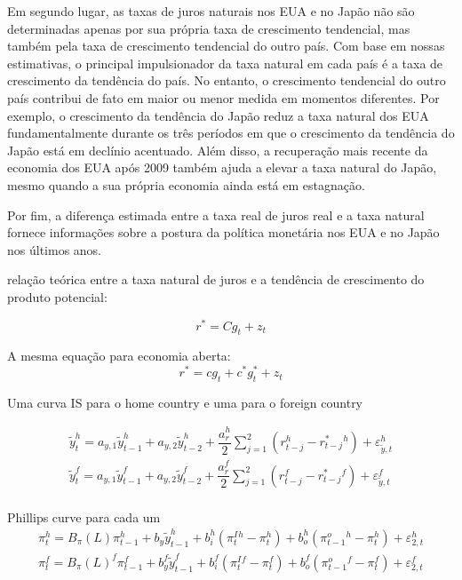 Em segundo lugar, as taxas de juros naturais nos EUA e no Japão não são determinadas apenas por sua própria taxa de crescimento tendencial, mas também pela taxa de crescimento tendencial do outro país. Com base em nossas estimativas, o principal impulsionador da taxa natural em cada país é a taxa de crescimento da tendência do país. No entanto, o crescimento tendencial do outro país contribui de fato em maior ou menor medida em momentos diferentes. Por exemplo, o crescimento da tendência do Japão reduz a taxa natural dos EUA fundamentalmente durante os três períodos em que o crescimento da tendência do Japão está em declínio acentuado. Além disso, a recuperação mais recente da economia dos EUA após 2009 também ajuda a elevar a taxa natural do Japão, mesmo quando a sua própria economia ainda está em estagnação.

Por fim, a diferença estimada entre a taxa real de juros real e a taxa natural fornece informações sobre a postura da política monetária nos EUA e no Japão nos últimos anos.

\citet{LW:2003} relação teórica entre a taxa natural de juros e a tendência de crescimento do produto potencial:

\begin{equation}
    r^{*} = C g_t + z_t
\end{equation}

A mesma equação para economia aberta:
\begin{equation}
    r^{*} = c g_t + c^{*} g_t^{*} + z_t
\end{equation}

Uma curva IS para o home country e uma para o foreign country

\begin{eqnarray}
    \tilde{y}_t^{h} = a_{y,1}\tilde{y}_{t-1}^{h} + a_{y,2}\tilde{y}_{t-2}^{h} + \dfrac{a_r^{h}}{2} \sum_{j=1}^{2} (r_{t-j}^{h} - r_{t-j}^{*}^{h}) + \varepsilon_{\tilde{y},t}^{h} \\
    \tilde{y}_t^{f} = a_{y,1}\tilde{y}_{t-1}^{f} + a_{y,2}\tilde{y}_{t-2}^{f} + \dfrac{a_r^{f}}{2} \sum_{j=1}^{2} (r_{t-j}^{f} - r_{t-j}^{*}^{f}) + \varepsilon_{\tilde{y},t}^{f} \\
    
\end{eqnarray}

Phillips curve para cada um
\begin{eqnarray}
    \pi_t^{h} = B_{\pi}(L)\pi_{t-1}^{h} + b_y \tilde{y}_{t-1}^{h} + b_i^{h}(\pi_t^{I}^{h} - \pi_t^{h} ) + b_{o}^{h}(\pi_{t-1}^{o}^{h} - \pi_t^{h}) + \varepsilon_{2,t}^{h} \\
    \pi_t^{f} = B_{\pi}(L)^{f}\pi_{t-1}^{f} + b_y^{f} \tilde{y}_{t-1}^{f} + b_i^{f}(\pi_t^{I}^{f} - \pi_t^{f} ) + b_{o}^{f}(\pi_{t-1}^{o}^{f} - \pi_t^{f}) + \varepsilon_{2,t}^{f}
    
\end{eqnarray}

